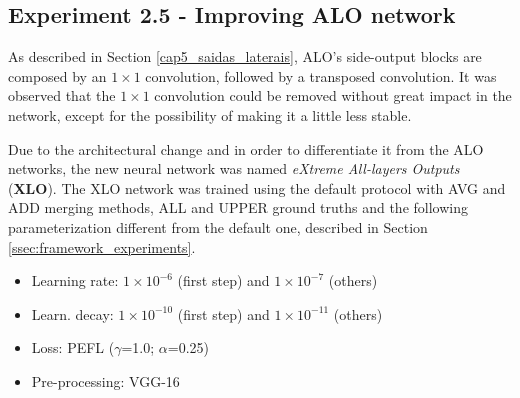 \subsection{Experiment 2.5 - Improving ALO network}
\label{ssec:bsds_subexp5}

% 

As described in Section \ref{cap5_saidas_laterais}, ALO's side-output blocks are composed by an $1 \times 1$ convolution, followed by a transposed convolution.
It was observed that the $1 \times 1$ convolution could be removed without great impact in the network, except for the possibility of making it a little less stable.

Due to the architectural change and in order to differentiate it from the ALO networks, the new neural network was named \textit{eXtreme All-layers Outputs} (\textbf{XLO}).
The XLO network was trained using the default protocol with AVG and ADD merging methods, ALL and UPPER ground truths and the following parameterization different from the default one, described in Section \ref{ssec:framework_experiments}.

\begin{itemize}
  \item Learning rate: $1 \times 10^{-6}$ (first step) and $1 \times 10^{-7}$ (others)
  \item Learn. decay: $1 \times 10^{-10}$ (first step) and $1 \times 10^{-11}$ (others)
  \item Loss: PEFL ($\gamma$=1.0; $\alpha$=0.25)
  \item Pre-processing: VGG-16
\end{itemize}

